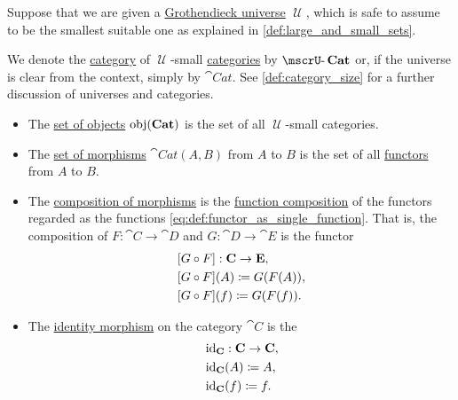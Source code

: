 \begin{definition}\label{def:category_of_small_categories}
  Suppose that we are given a \hyperref[def:grothendieck_universe]{Grothendieck universe} \( \mscrU \), which is safe to assume to be the smallest suitable one as explained in \cref{def:large_and_small_sets}.

  We denote the \hyperref[def:category]{category} of \( \mscrU \)-small \hyperref[def:category]{categories} by \( \ucat{Cat} \) or, if the universe is clear from the context, simply by \( \cat{Cat} \). See \cref{def:category_size} for a further discussion of universes and categories.

  \begin{itemize}
    \item The \hyperref[def:category/objects]{set of objects} \( \obj(\cat{Cat}) \) is the set of all \( \mscrU \)-small categories.

    \item The \hyperref[def:category/morphisms]{set of morphisms} \( \cat{Cat}(A, B) \) from \( A \) to \( B \) is the set of all \hyperref[def:functor]{functors} from \( A \) to \( B \).

    \item The \hyperref[def:category/composition]{composition of morphisms} is the \hyperref[def:set_valued_map/composition]{function composition} of the functors regarded as the functions \eqref{eq:def:functor_as_single_function}. That is, the composition of \( F: \cat{C} \to \cat{D} \) and \( G: \cat{D} \to \cat{E} \) is the functor
    \begin{equation}\label{eq:def:category_of_small_categories/composition}
      \begin{aligned}
        &[G \bincirc F]: \cat{C} \to \cat{E}, \\
        &[G \bincirc F](A) \coloneqq G(F(A)), \\
        &[G \bincirc F](f) \coloneqq G(F(f)).
      \end{aligned}
    \end{equation}

    \item The \hyperref[def:category/identity]{identity morphism} on the category \( \cat{C} \) is the 
    \begin{equation}\label{eq:def:category_of_small_categories/identity}
      \begin{aligned}
        &\id_{\cat{C}}: \cat{C} \to \cat{C}, \\
        &\id_{\cat{C}}(A) \coloneqq A, \\
        &\id_{\cat{C}}(f) \coloneqq f.
      \end{aligned}
    \end{equation}
  \end{itemize}
\end{definition}
